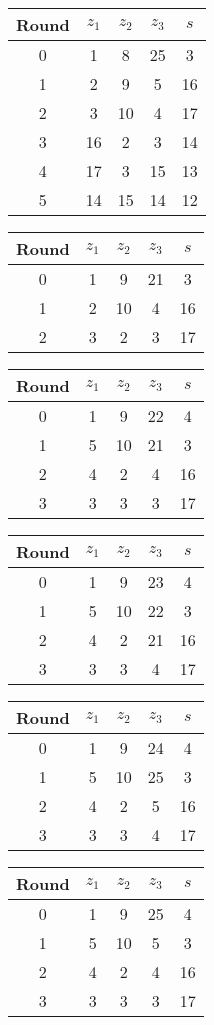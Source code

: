 \begin{multicols}{2}
\begin{tabular}{c | c | c | c | c }
Round & $z_1$ & $z_2$ & $z_3$ & $s$ \\
\hline
0 & 1 & 8 & 25 & 3 \\
1 & 2 & 9 & 5 & 16 \\
2 & 3 & 10 & 4 & 17 \\
3 & 16 & 2 & 3 & 14 \\
4 & 17 & 3 & 15 & 13 \\
5 & 14 & 15 & 14 & 12
\end{tabular}


\begin{tabular}{c | c | c | c | c }
Round & $z_1$ & $z_2$ & $z_3$ & $s$ \\
\hline
0 & 1 & 9 & 21 & 3 \\
1 & 2 & 10 & 4 & 16 \\
2 & 3 & 2 & 3 & 17
\end{tabular}


\begin{tabular}{c | c | c | c | c }
Round & $z_1$ & $z_2$ & $z_3$ & $s$ \\
\hline
0 & 1 & 9 & 22 & 4 \\
1 & 5 & 10 & 21 & 3 \\
2 & 4 & 2 & 4 & 16 \\
3 & 3 & 3 & 3 & 17
\end{tabular}


\begin{tabular}{c | c | c | c | c }
Round & $z_1$ & $z_2$ & $z_3$ & $s$ \\
\hline
0 & 1 & 9 & 23 & 4 \\
1 & 5 & 10 & 22 & 3 \\
2 & 4 & 2 & 21 & 16 \\
3 & 3 & 3 & 4 & 17
\end{tabular}


\begin{tabular}{c | c | c | c | c }
Round & $z_1$ & $z_2$ & $z_3$ & $s$ \\
\hline
0 & 1 & 9 & 24 & 4 \\
1 & 5 & 10 & 25 & 3 \\
2 & 4 & 2 & 5 & 16 \\
3 & 3 & 3 & 4 & 17
\end{tabular}


\begin{tabular}{c | c | c | c | c }
Round & $z_1$ & $z_2$ & $z_3$ & $s$ \\
\hline
0 & 1 & 9 & 25 & 4 \\
1 & 5 & 10 & 5 & 3 \\
2 & 4 & 2 & 4 & 16 \\
3 & 3 & 3 & 3 & 17
\end{tabular}



\end{multicols}
